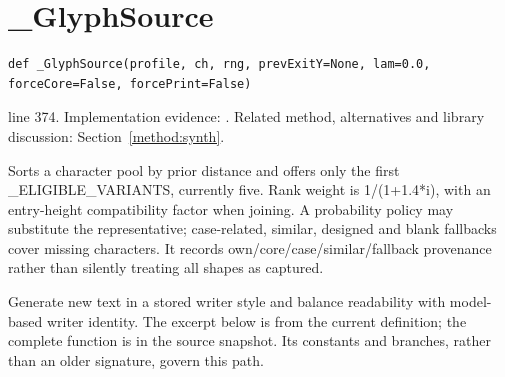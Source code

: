 \section{\_GlyphSource}\label{fn:synthesise:-GlyphSource}
\begin{lstlisting}[style=sig]
def _GlyphSource(profile, ch, rng, prevExitY=None, lam=0.0, forceCore=False, forcePrint=False)
\end{lstlisting}
 line 374. Implementation evidence: \cite{code2026}. Related method, alternatives and library discussion: Section~\ref{method:synth}.


Sorts a character pool by prior distance and offers only the first \_ELIGIBLE\_VARIANTS, currently five. Rank weight is 1/(1+1.4*i), with an entry-height compatibility factor when joining. A probability policy may substitute the representative; case-related, similar, designed and blank fallbacks cover missing characters. It records own/core/case/similar/fallback provenance rather than silently treating all shapes as captured.


Generate new text in a stored writer style and balance readability with model-based writer identity. The excerpt below is from the current definition; the complete function is in the source snapshot. Its constants and branches, rather than an older signature, govern this path.


